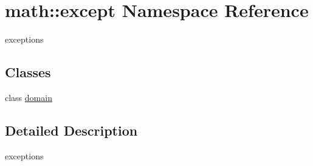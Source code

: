 \hypertarget{namespacemath_1_1except}{
\section{math::except Namespace Reference}
\label{namespacemath_1_1except}
}


exceptions  
\subsection*{Classes}
\begin{DoxyCompactItemize}
\item 
class \hyperlink{classmath_1_1except_1_1domain}{domain}
\end{DoxyCompactItemize}


\subsection{Detailed Description}
exceptions 
